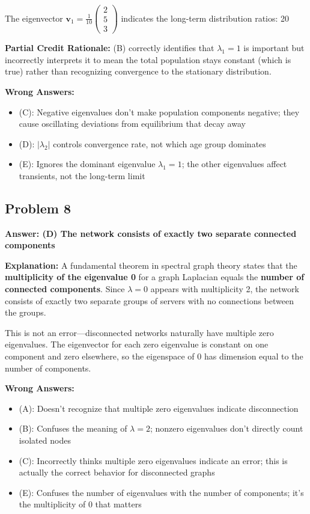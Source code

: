 \documentclass[12pt]{amsart}
\newcommand{\correct}[1]{{\color{correctgreen}\textbf{#1}}}
\begin{document}
The eigenvector $\mathbf{v}_1 = \frac{1}{10}\begin{pmatrix} 2 \\ 5 \\ 3 \end{pmatrix}$ indicates the long-term distribution ratios: 20%

\textbf{Partial Credit Rationale:} (B) correctly identifies that $\lambda_1 = 1$ is important but incorrectly interprets it to mean the total population stays constant (which is true) rather than recognizing convergence to the stationary distribution.

\textbf{Wrong Answers:}
\begin{itemize}
\item (C): Negative eigenvalues don't make population components negative; they cause oscillating deviations from equilibrium that decay away
\item (D): $|\lambda_2|$ controls convergence rate, not which age group dominates
\item (E): Ignores the dominant eigenvalue $\lambda_1 = 1$; the other eigenvalues affect transients, not the long-term limit
\end{itemize}

\subsection*{Problem 8}
\correct{Answer: (D) The network consists of exactly two separate connected components}

\textbf{Explanation:} A fundamental theorem in spectral graph theory states that the \textbf{multiplicity of the eigenvalue 0} for a graph Laplacian equals the \textbf{number of connected components}. Since $\lambda = 0$ appears with multiplicity 2, the network consists of exactly two separate groups of servers with no connections between the groups.

This is not an error—disconnected networks naturally have multiple zero eigenvalues. The eigenvector for each zero eigenvalue is constant on one component and zero elsewhere, so the eigenspace of 0 has dimension equal to the number of components.

\textbf{Wrong Answers:}
\begin{itemize}
\item (A): Doesn't recognize that multiple zero eigenvalues indicate disconnection
\item (B): Confuses the meaning of $\lambda = 2$; nonzero eigenvalues don't directly count isolated nodes
\item (C): Incorrectly thinks multiple zero eigenvalues indicate an error; this is actually the correct behavior for disconnected graphs
\item (E): Confuses the number of eigenvalues with the number of components; it's the multiplicity of 0 that matters
\end{itemize}
\end{document}
